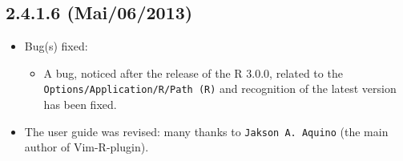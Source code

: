 \subsection{2.4.1.6 (Mai/06/2013)}
\begin{itemize}
  \item Bug(s) fixed:
    \begin{itemize}
      \item A bug, noticed after the release of the R 3.0.0, related to the \texttt{Options/Application/R/Path (R)}
       and recognition of the latest version has been fixed.
    \end{itemize}
  \item The user guide was revised: many thanks to \texttt{Jakson A. Aquino} (the main author of Vim-R-plugin).
\end{itemize}
